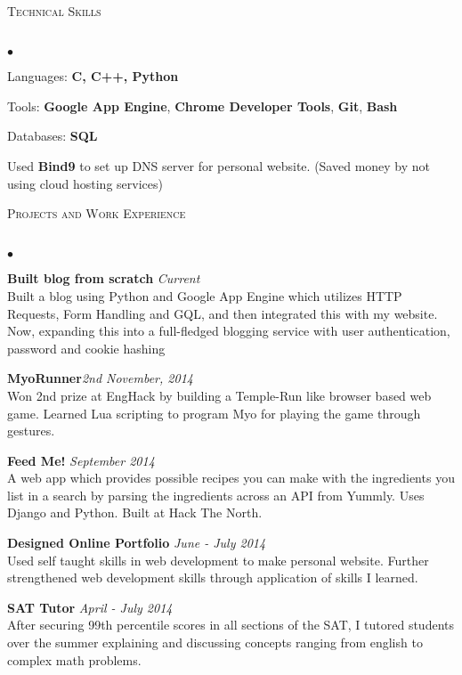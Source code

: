 \documentclass{article}
\newcommand{\lineunder}{\vspace*{-8pt} \\ \hspace*{-18pt} \hrulefill \\}
\newcommand{\header}[1]{{\hspace*{-15pt}\vspace*{6pt} \textsc{#1}} \vspace*{-6pt} \lineunder}
\newenvironment{achievements}{\begin{list}{$\bullet$}{\topsep 0pt \itemsep -1.5pt \leftmargin 5pt}}{\vspace*{4pt}\end{list}}
\begin{document}
\header{Technical Skills}
\begin{achievements}
\item Languages: \textbf{C, C++, Python}
\item Tools: \textbf{Google App Engine}, \textbf{Chrome Developer Tools}, \textbf{Git}, \textbf{Bash}
\item Databases: \textbf{SQL}
\item Used \textbf{Bind9} to set up DNS server for personal website. (Saved money by not using cloud hosting services)
\end{achievements}

\vspace{7pt}

\header{Projects and Work Experience}
\begin{achievements}
\item \textbf{Built blog from scratch} \hfill \textit {Current}
\\ Built a blog using Python and Google App Engine which utilizes HTTP Requests, Form Handling and GQL, and then integrated this with my website. Now, expanding this into a full-fledged blogging service with user authentication, password and cookie hashing
\item\textbf{MyoRunner}\hfill\textit{2nd November, 2014}
\\ Won 2nd prize at EngHack by building a Temple-Run like browser based web game. Learned Lua scripting to program Myo for playing the game through gestures. 
\item \textbf{Feed Me!} \hfill \textit {September 2014}
\\ A web app which provides possible recipes you can make with the ingredients you list in a search by parsing the ingredients across an API from Yummly. Uses Django and Python. Built at Hack The North.
\item \textbf{Designed Online Portfolio} \hfill \textit {June - July 2014}
\\ Used self taught skills in web development to make personal website. Further strengthened web development skills through application of skills I learned.
\item \textbf{SAT Tutor} \hfill \textit {April - July 2014}
\\ After securing 99th percentile scores in all sections of the SAT, I tutored students over the summer explaining and discussing concepts ranging from english to complex math problems.
\end{achievements}
\end{document}
